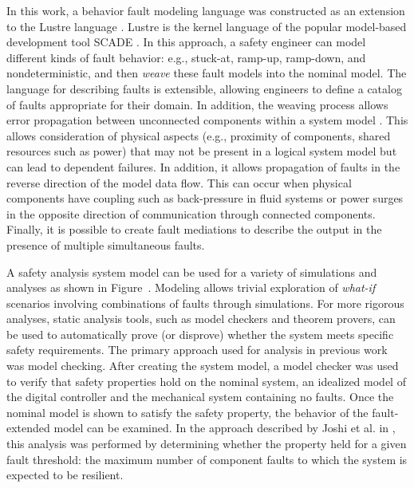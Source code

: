In this work, a behavior fault modeling language was constructed as an extension to the Lustre language \cite{Halbwachs91:IEEE}. Lustre is the kernel language of the popular model-based development tool SCADE \cite{SCADE}. In this approach, a safety engineer can model different kinds of fault behavior: e.g., stuck-at, ramp-up, ramp-down, and nondeterministic, and then {\em weave} these fault models into the nominal model. The language for describing faults is extensible, allowing engineers to define a catalog of faults appropriate for their domain. In addition, the weaving process allows error propagation between unconnected components within a system model \cite{Joshi07:Hase}. This allows consideration of physical aspects (e.g., proximity of components, shared resources such as power) that may not be present in a logical system model but can lead to dependent failures. In addition, it allows propagation of faults in the reverse direction of the model data flow. This can occur when physical components have coupling such as back-pressure in fluid systems or power surges in the opposite direction of communication through connected components. Finally, it is possible to create fault mediations to describe the output in the presence of multiple simultaneous faults.





A safety analysis system model can be used for a variety of simulations and analyses as shown in Figure~. Modeling allows trivial exploration of \textit{what-if} scenarios involving combinations of faults through simulations. For more rigorous analyses, static analysis tools, such as model checkers and theorem provers, can be used to automatically prove (or disprove) whether the system meets specific safety requirements.
The primary approach used for analysis in previous work was model checking. After creating the system model, a model checker was used to verify that safety properties hold on the nominal system, an idealized model of the digital controller and the mechanical system containing no faults. Once the nominal model is shown to satisfy the safety property, the behavior of the fault-extended model can be examined. In the approach described by Joshi et al. in \cite{Joshi05:Dasc, Joshi05:SafeComp, Joshi07:Hase}, this analysis was performed by determining whether the property held for a given fault threshold: the maximum number of component faults to which the system is expected to be resilient.

